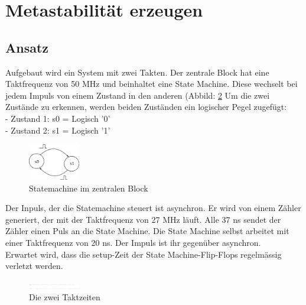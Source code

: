 \section{Metastabilität erzeugen}\label{sect.meatastabil_erzeugen}
\subsection{Ansatz}\label{sect.metastabil_ansatz}
Aufgebaut wird ein System mit zwei Takten. Der zentrale Block hat eine Taktfrequenz von 50 MHz und beinhaltet eine State Machine. Diese wechselt bei jedem Impuls von einem Zustand in den anderen (Abbild: \ref{fig.metastabil.statemachine} Um die zwei Zustände zu erkennen, werden beiden Zuständen ein logischer Pegel zugefügt:\\
\newline
- Zustand 1:  s0  = Logisch '0'\\
- Zustand 2:  s1  = Logisch '1'\\

\begin{figure}[H]
	\centering
	\includegraphics[width=0.2\textwidth]{images/metastability/statemachine_s0_s1.png}
	\caption{Statemachine im zentralen Block}
	\label{fig.metastabil.statemachine}
\end{figure}

Der Inpuls, der die Statemachine steuert ist asynchron. Er wird von einem Zähler generiert, der mit der Taktfrequenz von 27 MHz läuft. Alle 37 ns sendet der Zähler einen Puls an die State Machine. Die State Machine selbst arbeitet mit einer Taktfrequenz von 20 ns. Der Impuls ist ihr gegenüber asynchron.\\
\newline
Erwartet wird, dass die setup-Zeit der State Machine-Flip-Flops regelmässig verletzt werden. \\

\begin{figure}[H]
	\centering
	\includegraphics[width=0.2\textwidth]{images/metastability/2_takte.png}
	\caption{Die zwei Taktzeiten}
	\label{fig.metastabil.statemachine}
\end{figure}



